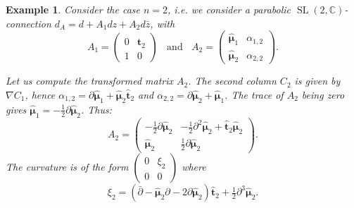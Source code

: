 \documentclass[11pt]{amsart}
\newtheorem{example}[thm]{Example}
\numberwithin{thm}{section} %
\numberwithin{equation}{section} %
\numberwithin{figure}{section} %
\newcommand*{\C}{\mathbb{C}}
\DeclareMathOperator{\SL}{SL}
\begin{document}
\begin{example}\label{Ex:n2}
Consider the case $n=2$, i.e. we consider a parabolic $\SL(2, \C)$-connection $d_A=d+A_1dz+A_2d\bar{z}$, with $$A_1=\begin{pmatrix} 0 & \bm\hat{t}_2 \\ 1 & 0 \end{pmatrix} \;\;\text{ and }\;\; A_2=\begin{pmatrix} \bm\hat{\mu}_1 & \alpha_{1,2} \\ \bm\hat{\mu}_2 & \alpha_{2,2} \end{pmatrix}.$$

Let us compute the transformed matrix $A_2$. The second column $C_2$ is given by $\nabla C_1$, hence $\alpha_{1,2}=\partial\bm\hat{\mu}_1+\bm\hat{\mu}_2\bm\hat{t}_2$ and $\alpha_{2,2}=\partial\bm\hat{\mu}_2+\bm\hat{\mu}_1$. The trace of $A_2$ being zero gives $\bm\hat{\mu}_1=-\tfrac{1}{2}\partial\bm\hat{\mu}_2$. Thus:
$$A_2 = \left( \begin{array}{cc}
	-\frac{1}{2}\partial \bm\hat{\mu}_2 & -\frac{1}{2}\partial^2 \bm\hat{\mu}_2+\bm\hat{t}_2\bm\hat{\mu}_2 \\
	\bm\hat{\mu}_2 & \frac{1}{2}\partial \bm\hat{\mu}_2 
\end{array} \right).$$
The curvature is of the form $\left( \begin{smallmatrix} 0 & \xi_2 \\ 0 & 0 \end{smallmatrix} \right)$
where
$$\xi_2 = (\bar{\partial}-\bm\hat{\mu}_2\partial-2\partial\bm\hat{\mu}_2)\bm\hat{t}_2+\tfrac{1}{2}\partial^3\bm\hat{\mu}_2.$$
\end{example}
\end{document}
